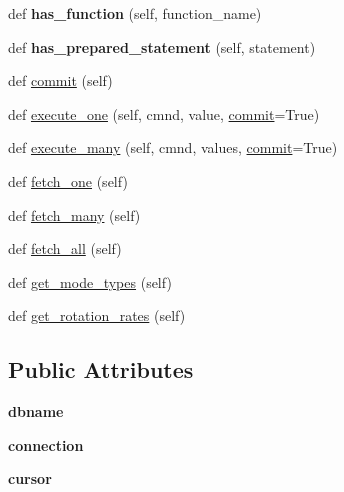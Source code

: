 \begin{DoxyCompactItemize}
\mbox{\label{classasamba_1_1db__def_1_1grid__db_ae1eeb52929dd95405ed2cdd1fa7e4e34}} 
def {\bfseries has\+\_\+function} (self, function\+\_\+name)
\item 
\mbox{\label{classasamba_1_1db__def_1_1grid__db_a94bbd02b0b7cc0454158f787c0ab3e8d}} 
def {\bfseries has\+\_\+prepared\+\_\+statement} (self, statement)
\item 
def \hyperlink{classasamba_1_1db__def_1_1grid__db_ab9bebf7f7c59d58113210aa514e20000}{commit} (self)
\item 
def \hyperlink{classasamba_1_1db__def_1_1grid__db_a818c15b631b12709a243334f8757066c}{execute\+\_\+one} (self, cmnd, value, \hyperlink{classasamba_1_1db__def_1_1grid__db_ab9bebf7f7c59d58113210aa514e20000}{commit}=True)
\item 
def \hyperlink{classasamba_1_1db__def_1_1grid__db_af8c4c50b39e4fb32a27e4f696240d806}{execute\+\_\+many} (self, cmnd, values, \hyperlink{classasamba_1_1db__def_1_1grid__db_ab9bebf7f7c59d58113210aa514e20000}{commit}=True)
\item 
def \hyperlink{classasamba_1_1db__def_1_1grid__db_a09c07f75a90b670fef71c6aacdca30a2}{fetch\+\_\+one} (self)
\item 
def \hyperlink{classasamba_1_1db__def_1_1grid__db_abd1922057f7741ee343b59cb9d948ffb}{fetch\+\_\+many} (self)
\item 
def \hyperlink{classasamba_1_1db__def_1_1grid__db_aff28a89e835e0a22e3a7c2593a165179}{fetch\+\_\+all} (self)
\item 
def \hyperlink{classasamba_1_1db__def_1_1grid__db_a636c6c1f259ea69934184876f9faa9ea}{get\+\_\+mode\+\_\+types} (self)
\item 
def \hyperlink{classasamba_1_1db__def_1_1grid__db_a27c84439882e562a5e7b53c39d43383f}{get\+\_\+rotation\+\_\+rates} (self)
\end{DoxyCompactItemize}
\subsection*{Public Attributes}
\begin{DoxyCompactItemize}
\item 
\mbox{\label{classasamba_1_1db__def_1_1grid__db_aaf61555b930002afaaf8f8382648e354}} 
{\bfseries dbname}
\item 
\mbox{\label{classasamba_1_1db__def_1_1grid__db_a93434f2a337d35270309f51e8174e4fa}} 
{\bfseries connection}
\item 
\mbox{\label{classasamba_1_1db__def_1_1grid__db_a29dc328457e15c0490c74cc0c4984fb5}} 
{\bfseries cursor}
\end{DoxyCompactItemize}


